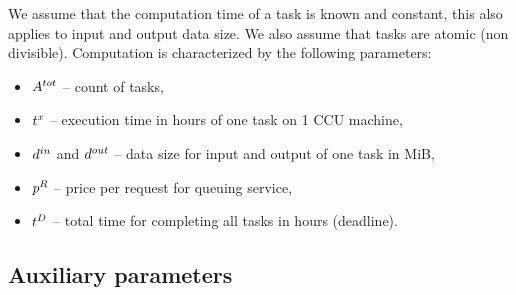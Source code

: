 {  We assume that the computation time of a task is known and constant, this also applies to input and output data size. We also assume that tasks are atomic (non divisible). Computation is characterized by the following parameters:
  \begin{itemize}
      \item $A^{tot}$ -- count of tasks,
      \item $t^x$ -- execution time in hours of one task on 1 CCU
      machine,
      \item $d^{in}$ and $d^{out}$ -- data size for input and
      output of one task in MiB,
      \item $p^{R}$ -- price per request for queuing service,
      \item $t^D$ -- total time for completing all tasks in hours (deadline).
  \end{itemize} 

\subsection{Auxiliary parameters}

}
